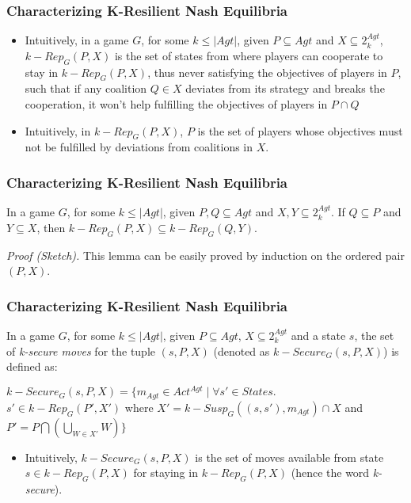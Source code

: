 \documentclass{beamer}
\begin{document}
\begin{frame}
\frametitle{Characterizing K-Resilient Nash Equilibria}
\begin{itemize}
\item Intuitively, in a game $G$, for some $k \leq \vert Agt \vert$, given $P \subseteq Agt$ and $X \subseteq 2^{Agt}_{k}$, $k-Rep_{G}(P, X)$ is the set of states from where players can cooperate to stay in $k-Rep_{G}(P, X)$, thus never satisfying the objectives of players in $P$, such that if any coalition $Q \in X$ deviates from its strategy and breaks the cooperation, it won't help fulfilling the objectives of players in $P \cap Q$
\item Intuitively, in $k-Rep_{G}(P, X)$, $P$ is the set of players whose objectives must not be fulfilled by deviations from coalitions in $X$.
\end{itemize}
\end{frame}

\begin{frame}
\frametitle{Characterizing K-Resilient Nash Equilibria}
\begin{lemma}[2]
In a game $G$, for some $k \leq \vert Agt \vert$, given $P, Q \subseteq Agt$ and $X, Y \subseteq 2^{Agt}_{k}$. If $Q \subseteq P$ and $Y \subseteq X$, then $k-Rep_{G}(P, X) \subseteq k-Rep_{G}(Q, Y)$.
\end{lemma}
\textit{Proof (Sketch).} This lemma can be easily proved by induction on the ordered pair $(P, X)$.
\end{frame}

\begin{frame}
\frametitle{Characterizing K-Resilient Nash Equilibria}
\begin{definition}
In a game $G$, for some $k \leq \vert Agt \vert$, given $P \subseteq Agt$, $X \subseteq 2^{Agt}_{k}$ and a state $s$, the set of \textit{k-secure moves} for the tuple $(s, P, X)$ (denoted as $k-Secure_{G}(s, P, X)$) is defined as:

$k-Secure_{G}(s, P, X) = \bigg\lbrace m_{Agt} \in Act^{Agt} \; \bigg\vert \; \forall s' \in States.$\\$s' \in k-Rep_{G}(P', X')$ where $X' = k-Susp_{G}((s, s'), m_{Agt}) \cap X$ and $P' = P \bigcap \left( \bigcup \limits_{W \in X'}W \right)\bigg\rbrace$
\end{definition}
\begin{itemize}
\item Intuitively, $k-Secure_{G}(s, P, X)$ is the set of moves available from state $s \in k-Rep_{G}(P, X)$ for staying in $k-Rep_{G}(P, X)$ (hence the word \textit{k-secure}).
\end{itemize}
\end{frame}
\end{document}
